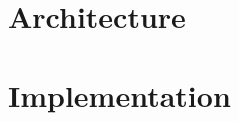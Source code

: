 \section{Architecture}
\label{section:architecture}



\section{Implementation}
\label{section:implementation}


